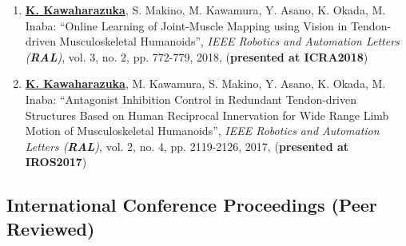 \documentclass[letterpaper]{article}
\begin{document}
\begin{enumerate}
\item \underline{\textbf{K. Kawaharazuka}}, S. Makino, M. Kawamura, Y. Asano, K. Okada, M. Inaba: ``Online Learning of Joint-Muscle Mapping using Vision in Tendon-driven Musculoskeletal Humanoids'', \textit{IEEE Robotics and Automation Letters (\textit{\textbf{RAL}})}, vol. 3, no. 2, pp. 772-779, 2018, (\textbf{presented at ICRA2018})
\item \underline{\textbf{K. Kawaharazuka}}, M. Kawamura, S. Makino, Y. Asano, K. Okada, M. Inaba: ``Antagonist Inhibition Control in Redundant Tendon-driven Structures Based on Human Reciprocal Innervation for Wide Range Limb Motion of Musculoskeletal Humanoids'', \textit{IEEE Robotics and Automation Letters (\textit{\textbf{RAL}})}, vol. 2, no. 4, pp. 2119-2126, 2017, (\textbf{presented at IROS2017})
\end{enumerate}

\subsection*{International Conference Proceedings (Peer Reviewed)}
\end{document}
